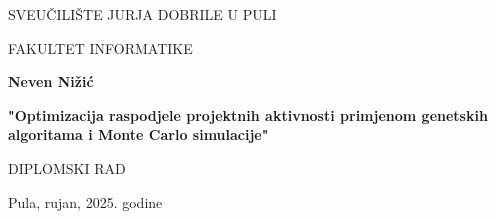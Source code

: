 \begin{center}
SVEUČILIŠTE JURJA DOBRILE U PULI 

FAKULTET INFORMATIKE

\vspace{45mm} 

\textbf{Neven Nižić}

\vspace{20mm} 

\textbf{"Optimizacija raspodjele projektnih aktivnosti primjenom genetskih algoritama i Monte Carlo simulacije"}

\vspace{5mm}
DIPLOMSKI RAD

\vfill

Pula, rujan, 2025. godine
\end{center}
